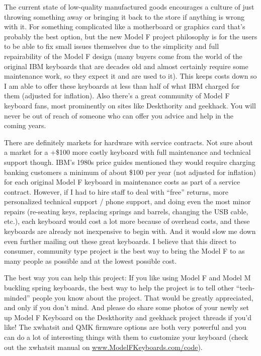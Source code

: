 \documentclass[a5paper, twoside]{memoir}
\begin{document}
    The current state of low-quality manufactured goods encourages a culture of just throwing something away or bringing it back to the store if anything is wrong with it.  For something complicated like a motherboard or graphics card that’s probably the best option, but the new Model F project philosophy is for the users to be able to fix small issues themselves due to the simplicity and full repairability of the Model F design (many buyers come from the world of the original IBM keyboards that are decades old and almost certainly require some maintenance work, so they expect it and are used to it). This keeps costs down so I am able to offer these keyboards at less than half of what IBM charged for them (adjusted for inflation). Also there’s a great community of Model F keyboard fans, most prominently on sites like Deskthority and geekhack. You will never be out of reach of someone who can offer you advice and help in the coming years.

    There are definitely markets for hardware with service contracts. Not sure about a market for a +\$100 more costly keyboard with full maintenance and technical support though. IBM’s 1980s price guides mentioned they would require charging banking customers a minimum of about \$100 per year (not adjusted for inflation) for each original Model F keyboard in maintenance costs as part of a service contract. However, if I had to hire staff to deal with ``free'' returns, more personalized technical support / phone support, and doing even the most minor repairs (re-seating keys, replacing springs and barrels, changing the USB cable, etc.), each keyboard would cost a lot more because of overhead costs, and these keyboards are already not inexpensive to begin with. And it would slow me down even further mailing out these great keyboards. I believe that this direct to consumer, community type project is the best way to bring the Model F to as many people as possible and at the lowest possible cost.

    The best way you can help this project:  If you like using Model F and Model M buckling spring keyboards, the best way to help the project is to tell other ``tech-minded'' people you know about the project. That would be greatly appreciated, and only if you don’t mind. And please do share some photos of your newly set up Model F Keyboard on the Deskthority and geekhack project threads if you’d like!  The xwhatsit and QMK firmware options are both very powerful and you can do a lot of interesting things with them to customize your keyboard (check out the xwhatsit manual on \url{www.ModelFKeyboards.com/code}).
\end{document}
